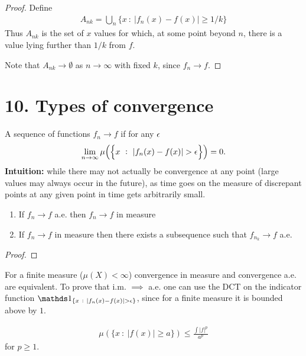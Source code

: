 \begin{proof}
  Define
  \begin{align*}
    A_{nk} = \bigcup_n \{x ~:~ |f_n(x) - f(x)| \geq 1/k \}
  \end{align*}
  Thus $A_{nk}$ is the set of $x$ values for which, at some point beyond $n$, there is a value lying further than $1/k$ from $f$.

  Note that $A_{nk} \to \emptyset$ as $n \to \infty$ with fixed $k$, since $f_n \to f$.


\end{proof}

\section{10. Types of convergence}

\begin{definition}
 A sequence of functions $f_n \to f$  if for any $\epsilon$
 \begin{align*}
   \limn \mu\Big(\Big\{x ~:~ |f_n(x) - f(x)| > \eps\Big\}\Big) = 0.
 \end{align*}
 {\bf Intuition:} while there may not actually be convergence at any point (large values may always occur in the future),
 as time goes on the measure of discrepant points at any given point in time gets arbitrarily small.
\end{definition}

\begin{theorem}
  \begin{enumerate}
  \item If $f_n \to f$ a.e. then $f_n \to f$ in measure
  \item If $f_n \to f$ in measure then there exists a subsequence such that $f_{n_k} \to f$ a.e.
  \end{enumerate}
\end{theorem}

\begin{proof}
\end{proof}

\begin{remark*}
  For a finite measure ($\mu(X) < \infty$) convergence in measure and convergence a.e. are equivalent. To prove
  that i.m. $\implies$ a.e. one can use the DCT on the indicator
  function $\ind_{\{x ~:~ |f_n(x) - f(x)| > \eps\}}$, since for a finite measure it is bounded above by $1$.
\end{remark*}

\begin{theorem}
  \begin{align*}
    \mu(\{x ~:~ |f(x)| \geq a\}) \leq \frac{\int |f|^p}{a^p}
  \end{align*}
    for $p \geq 1$.
\end{theorem}

